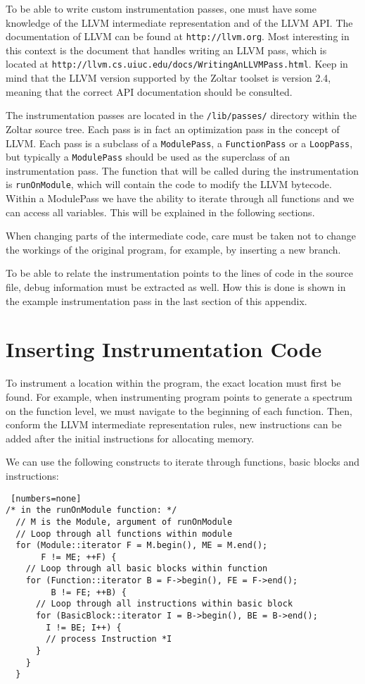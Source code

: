 
To be able to write custom instrumentation passes,
one must have some knowledge of the LLVM intermediate
representation and of the LLVM API.
The documentation of LLVM can be found at
\verb|http://llvm.org|.
Most interesting in this context is the document that
handles writing an LLVM pass, which is located at
\verb|http://llvm.cs.uiuc.edu/docs/WritingAnLLVMPass.html|.
Keep in mind that the LLVM version supported by
the Zoltar toolset is version 2.4, 
meaning that the correct API documentation should be consulted.

The instrumentation passes are located in the 
\verb|/lib/passes/| directory within the Zoltar 
source tree.
Each pass is in fact an optimization pass
in the concept of LLVM.
Each pass is a subclass of a \verb|ModulePass|,
a \verb|FunctionPass| or a \verb|LoopPass|,
but typically a \verb|ModulePass| should be
used as the superclass of an instrumentation pass.
The function that will be called during the instrumentation
is \verb|runOnModule|, 
which will contain the code to modify the LLVM bytecode.
Within a ModulePass we have the ability to
iterate through all functions and we can access
all variables.
This will be explained in the following sections.

When changing parts of the intermediate code,
care must be taken not to change the workings
of the original program, for example,
by inserting a new branch.

To be able to relate the instrumentation points to the
lines of code in the source file, debug information must
be extracted as well.
How this is done is shown in the example instrumentation
pass in the last section of this appendix.




\section{Inserting Instrumentation Code}

To instrument a location within the program,
the exact location must first be found.
For example, when instrumenting program points to
generate a spectrum on the function level,
we must navigate to the beginning of each function.
Then, conform the LLVM intermediate representation rules,
new instructions can be added after the initial instructions
for allocating memory.

We can use the following constructs to iterate
through functions, basic blocks and instructions:

\begin{lstlisting} [numbers=none]
/* in the runOnModule function: */
  // M is the Module, argument of runOnModule
  // Loop through all functions within module
  for (Module::iterator F = M.begin(), ME = M.end(); 
       F != ME; ++F) {
    // Loop through all basic blocks within function
    for (Function::iterator B = F->begin(), FE = F->end(); 
         B != FE; ++B) {
      // Loop through all instructions within basic block
      for (BasicBlock::iterator I = B->begin(), BE = B->end(); 
        I != BE; I++) {
        // process Instruction *I
      }
    }
  }
\end{lstlisting}

